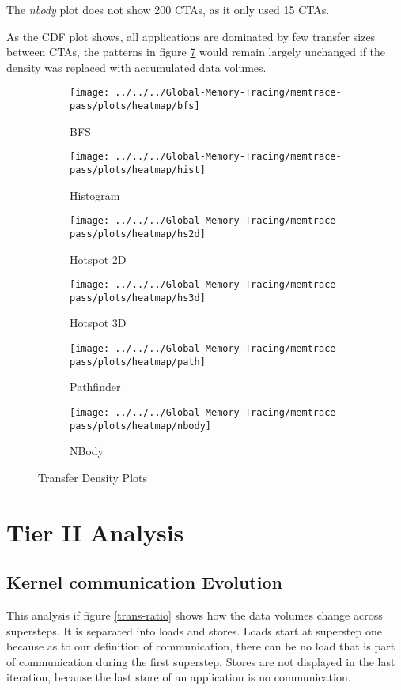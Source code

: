 The \textit{nbody} plot does not show 200 CTAs, as it only used 15 CTAs.

As the CDF plot shows, all applications are dominated by few transfer sizes between CTAs, the patterns in figure \ref{fig:density-plots} would remain largely unchanged if the density was replaced with accumulated data volumes.
\begin{figure}[h!]
	\begin{subfigure}[b]{0.45\textwidth}
		\texttt{[image: ../../../Global-Memory-Tracing/memtrace-pass/plots/heatmap/bfs]}
		\caption{BFS}
		\label{fig:density-bfs}
	\end{subfigure}
	\begin{subfigure}[b]{0.45\textwidth}
		\texttt{[image: ../../../Global-Memory-Tracing/memtrace-pass/plots/heatmap/hist]}
		\caption{Histogram}
		\label{fig:density-hist}
	\end{subfigure}
	\begin{subfigure}[b]{0.45\textwidth}
		\texttt{[image: ../../../Global-Memory-Tracing/memtrace-pass/plots/heatmap/hs2d]}
		\caption{Hotspot 2D}
		\label{fig:density-hs2d}
	\end{subfigure}
	\begin{subfigure}[b]{0.45\textwidth}
		\texttt{[image: ../../../Global-Memory-Tracing/memtrace-pass/plots/heatmap/hs3d]}
		\caption{Hotspot 3D}
		\label{fig:density-hs3d}
	\end{subfigure}
	\begin{subfigure}[b]{0.45\textwidth}
		\texttt{[image: ../../../Global-Memory-Tracing/memtrace-pass/plots/heatmap/path]}
		\caption{Pathfinder}
		\label{fig:density-path}
	\end{subfigure}
	\hfill
	\begin{subfigure}[b]{0.45\textwidth}
		\texttt{[image: ../../../Global-Memory-Tracing/memtrace-pass/plots/heatmap/nbody]}
		\caption{NBody}
		\label{fig:density-nbody}
	\end{subfigure}
	\caption{Transfer Density Plots}
	\label{fig:density-plots}
\end{figure}

\section{Tier II Analysis}
\subsection{Kernel communication Evolution}
This analysis if figure \ref{trans-ratio} shows how the data volumes change across supersteps. It is separated into loads and stores. Loads start at superstep one because as to our definition of communication, there can be no load that is part
of communication during the first superstep. Stores are not displayed in the last iteration, because the last store of an application is no communication.

